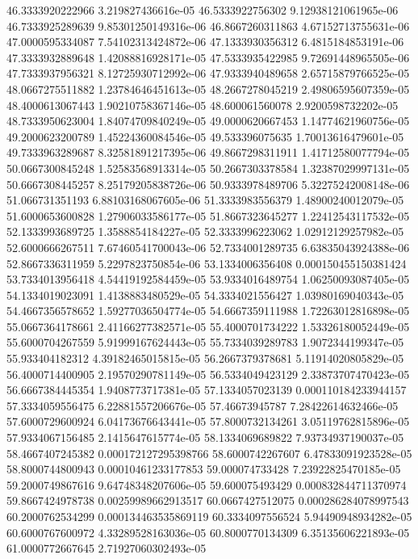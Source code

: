 {46.3333920222966 3.219827436616e-05
46.5333922756302 9.12938121061965e-06
46.7333925289639 9.85301250149316e-06
46.8667260311863 4.67152713755631e-06
47.0000595334087 7.54102313424872e-06
47.1333930356312 6.4815184853191e-06
47.3333932889648 1.42088816928171e-05
47.5333935422985 9.72691448965505e-06
47.7333937956321 8.12725930712992e-06
47.9333940489658 2.65715879766525e-05
48.0667275511882 1.23784646451613e-05
48.2667278045219 2.49806595607359e-05
48.4000613067443 1.90210758367146e-05
48.600061560078 2.9200598732202e-05
48.7333950623004 1.84074709840249e-05
49.0000620667453 1.14774621960756e-05
49.2000623200789 1.45224360084546e-05
49.533396075635 1.70013616479601e-05
49.7333963289687 8.32581891217395e-06
49.8667298311911 1.41712580077794e-05
50.0667300845248 1.52583568913314e-05
50.2667303378584 1.32387029997131e-05
50.6667308445257 8.25179205838726e-06
50.9333978489706 5.32275242008148e-06
51.066731351193 6.88103168067605e-06
51.3333983556379 1.48900240012079e-05
51.6000653600828 1.27906033586177e-05
51.8667323645277 1.22412543117532e-05
52.1333993689725 1.3588854184227e-05
52.3333996223062 1.02912129257982e-05
52.6000666267511 7.67460541700043e-06
52.7334001289735 6.63835043924388e-06
52.8667336311959 5.2297823750854e-06
53.1334006356408 0.000150455150381424
53.7334013956418 4.54419192584459e-05
53.9334016489754 1.06250093087405e-05
54.1334019023091 1.4138883480529e-05
54.3334021556427 1.03980169040343e-05
54.4667356578652 1.59277036504774e-05
54.6667359111988 1.72263012816898e-05
55.0667364178661 2.41166277382571e-05
55.4000701734222 1.53326180052449e-05
55.6000704267559 5.91999167624443e-05
55.7334039289783 1.9072344199347e-05
55.933404182312 4.39182465015815e-05
56.2667379378681 5.11914020805829e-05
56.4000714400905 2.19570290781149e-05
56.5334049423129 2.33873707470423e-05
56.6667384445354 1.9408773717381e-05
57.1334057023139 0.000110184233944157
57.3334059556475 6.22881557206676e-05
57.46673945787 7.28422614632466e-05
57.6000729600924 6.04173676643441e-05
57.8000732134261 3.05119762815896e-05
57.9334067156485 2.1415647615774e-05
58.1334069689822 7.93734937190037e-05
58.4667407245382 0.000172127295398766
58.6000742267607 6.47833091923528e-05
58.8000744800943 0.00010461233177853
59.000074733428 7.23922825470185e-05
59.2000749867616 9.64748348207606e-05
59.600075493429 0.000832844711370974
59.8667424978738 0.00259989662913517
60.0667427512075 0.000286284078997543
60.2000762534299 0.000134463535869119
60.3334097556524 5.94490948934282e-05
60.6000767600972 4.33289528163036e-05
60.8000770134309 6.35135606221893e-05
61.0000772667645 2.71927060302493e-05
}
